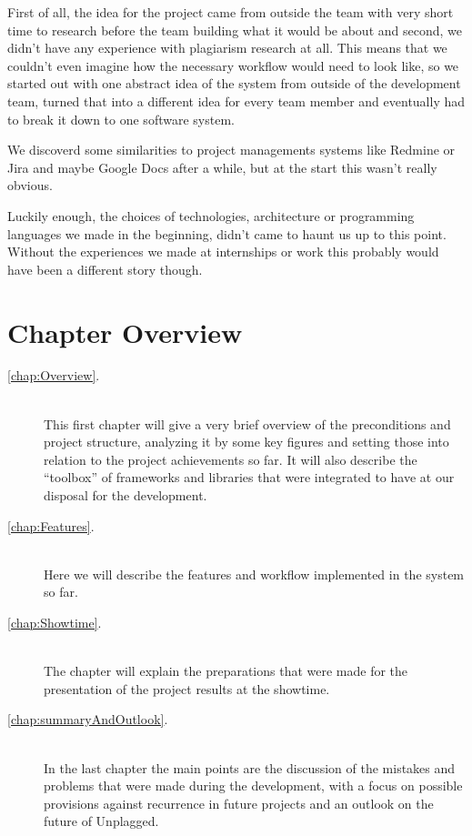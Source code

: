 First of all, the idea for the project came from outside the team with very short time to research before the team building what it would be 
about and second, we didn't have any experience with plagiarism research at all. 
This means that we couldn't even imagine how the necessary workflow would need to look like, so we started out with one abstract idea of the system 
from outside of the development team, turned that into a different idea for every team member and eventually had to break it down to one software system.

We discoverd some similarities to project managements systems like Redmine or Jira and maybe Google Docs after a while, but at the start this wasn't really obvious.

Luckily enough, the choices of technologies, architecture or programming languages we made in the beginning, didn't came to haunt us up to this point. Without the experiences we made at internships or work this probably would have been a different story though.

\section*{Chapter Overview}

\begin{description}
\item[\ref{chap:Overview}. ] \hfill \\
This first chapter will give a very brief overview of the preconditions and project structure, analyzing it by some key figures and setting those into relation to the project achievements so far. It will also describe the \enquote{toolbox} of
frameworks and libraries that were integrated to have at our disposal for the development.
\item[\ref{chap:Features}. ] \hfill \\
Here we will describe the features and workflow implemented in the system so far.
\item[\ref{chap:Showtime}. ] \hfill \\
The chapter  will explain the preparations that were made for the presentation of the project results at the showtime.
\item[\ref{chap:summaryAndOutlook}. ] \hfill \\
In the last chapter the main points are the discussion of the mistakes and
problems that were made during the development, with a focus on possible provisions against recurrence in future projects and an
outlook on the future of Unplagged.
\end{description}

